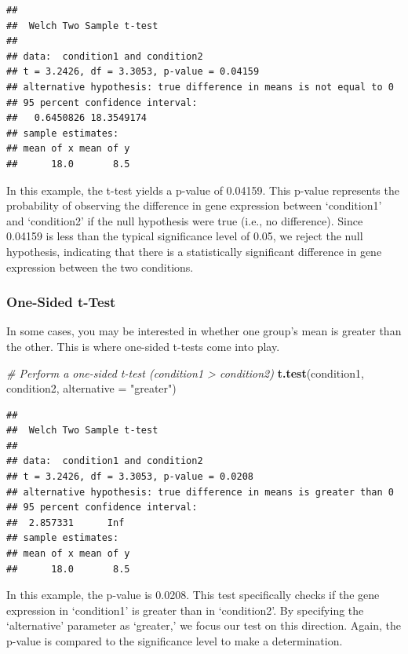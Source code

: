 \documentclass[
]{book}
\newenvironment{Shaded}{\begin{snugshade}}{\end{snugshade}}
\newcommand{\AttributeTok}[1]{\textcolor[rgb]{0.13,0.29,0.53}{#1}}
\newcommand{\CommentTok}[1]{\textcolor[rgb]{0.56,0.35,0.01}{\textit{#1}}}
\newcommand{\FunctionTok}[1]{\textcolor[rgb]{0.13,0.29,0.53}{\textbf{#1}}}
\newcommand{\NormalTok}[1]{#1}
\newcommand{\StringTok}[1]{\textcolor[rgb]{0.31,0.60,0.02}{#1}}
\begin{document}
\begin{verbatim}
## 
##  Welch Two Sample t-test
## 
## data:  condition1 and condition2
## t = 3.2426, df = 3.3053, p-value = 0.04159
## alternative hypothesis: true difference in means is not equal to 0
## 95 percent confidence interval:
##   0.6450826 18.3549174
## sample estimates:
## mean of x mean of y 
##      18.0       8.5
\end{verbatim}

In this example, the t-test yields a p-value of 0.04159. This p-value represents the probability of observing the difference in gene expression between `condition1' and `condition2' if the null hypothesis were true (i.e., no difference). Since 0.04159 is less than the typical significance level of 0.05, we reject the null hypothesis, indicating that there is a statistically significant difference in gene expression between the two conditions.

\hypertarget{one-sided-t-test}{%
\subsubsection{One-Sided t-Test}\label{one-sided-t-test}}

In some cases, you may be interested in whether one group's mean is greater than the other. This is where one-sided t-tests come into play.

\begin{Shaded}
\begin{Highlighting}[]
\CommentTok{\# Perform a one{-}sided t{-}test (condition1 \textgreater{} condition2)}
\FunctionTok{t.test}\NormalTok{(condition1, condition2, }\AttributeTok{alternative =} \StringTok{"greater"}\NormalTok{)}
\end{Highlighting}
\end{Shaded}

\begin{verbatim}
## 
##  Welch Two Sample t-test
## 
## data:  condition1 and condition2
## t = 3.2426, df = 3.3053, p-value = 0.0208
## alternative hypothesis: true difference in means is greater than 0
## 95 percent confidence interval:
##  2.857331      Inf
## sample estimates:
## mean of x mean of y 
##      18.0       8.5
\end{verbatim}

In this example, the p-value is 0.0208. This test specifically checks if the gene expression in `condition1' is greater than in `condition2'. By specifying the `alternative' parameter as `greater,' we focus our test on this direction. Again, the p-value is compared to the significance level to make a determination.
\end{document}
